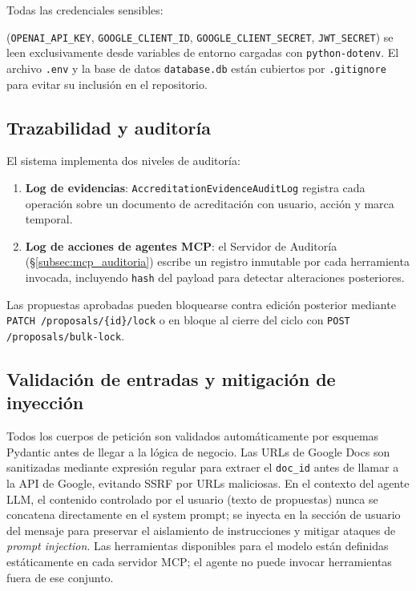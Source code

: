 Todas las credenciales sensibles:

(\texttt{OPENAI\_API\_KEY},
\texttt{GOOGLE\_CLIENT\_ID}, \texttt{GOOGLE\_CLIENT\_SECRET},
\texttt{JWT\_SECRET}) se leen exclusivamente desde variables de entorno
cargadas con \texttt{python-dotenv}.
El archivo \texttt{.env} y la base de datos \texttt{database.db}
están cubiertos por \texttt{.gitignore} para evitar su inclusión
en el repositorio.

\subsection{Trazabilidad y auditoría}
\label{subsec:seg_auditoria}

El sistema implementa dos niveles de auditoría:

\begin{enumerate}
  \item \textbf{Log de evidencias}: \texttt{AccreditationEvidenceAuditLog}
registra cada operación sobre un documento de acreditación con
usuario, acción y marca temporal.
  \item \textbf{Log de acciones de agentes MCP}: el Servidor de Auditoría
(§\ref{subsec:mcp_auditoria}) escribe un registro inmutable por cada
herramienta invocada, incluyendo \texttt{hash} del payload para detectar
alteraciones posteriores.
\end{enumerate}

Las propuestas aprobadas pueden bloquearse contra edición posterior
mediante \texttt{PATCH /proposals/\{id\}/lock} o en bloque al cierre
del ciclo con \texttt{POST /proposals/bulk-lock}.

\subsection{Validación de entradas y mitigación de inyección}
\label{subsec:seg_inputs}

Todos los cuerpos de petición son validados automáticamente por esquemas
Pydantic antes de llegar a la lógica de negocio.
Las URLs de Google Docs son sanitizadas mediante expresión regular para
extraer el \texttt{doc\_id} antes de llamar a la API de Google,
evitando SSRF por URLs maliciosas.
En el contexto del agente LLM, el contenido controlado por el usuario
(texto de propuestas) nunca se concatena directamente en el system prompt;
se inyecta en la sección de usuario del mensaje para preservar el
aislamiento de instrucciones y mitigar ataques de \emph{prompt injection}.
Las herramientas disponibles para el modelo están definidas estáticamente
en cada servidor MCP; el agente no puede invocar herramientas fuera
de ese conjunto.

